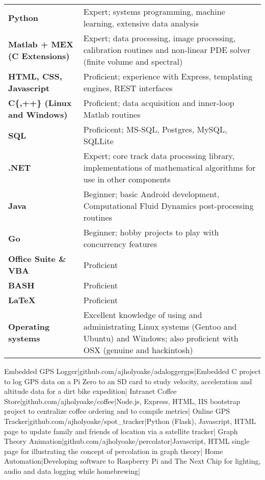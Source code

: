\documentclass[a4paper,10pt]{article}
\begin{document}
\begin{tabular}{p{2.8in}p{3.3in}}
\textbf{Python} & Expert; systems programming, machine learning, extensive data analysis \\
\textbf{Matlab + MEX (C Extensions)} & Expert; data processing, image processing, calibration routines and non-linear PDE solver (finite volume and spectral)\\
\textbf{HTML, CSS, Javascript} & Proficient; experience with Express, templating engines, REST interfaces\\
\textbf{C\{,++\} (Linux and Windows)}     & Proficient; data acquisition and inner-loop Matlab routines\\
\textbf{SQL} & Proficicent; MS-SQL, Postgres, MySQL, SQLLite \\
\textbf{.NET} & Expert; core track data processing library, implementations of mathematical algorithms for use in other components \\
\textbf{Java} & Beginner; basic Android development, Computational Fluid Dynamics post-processing routines\\
\textbf{Go} & Beginner; hobby projects to play with concurrency features\\
\textbf{Office Suite \& VBA} & Proficient\\
\textbf{BASH}   & Proficient\\
\textbf{\LaTeX} & Proficient\\
  \textbf{Operating systems} & Excellent knowledge of using and administrating Linux systems (Gentoo and Ubuntu) and Windows; also proficient with OSX (genuine and hackintosh)\\
\end{tabular}
\newline
\lineunder

\begin{2colsection}
\Rcc Embedded GPS Logger|github.com/ajholyoake/adaloggergps|Embedded C project
to log GPS data on a Pi Zero to an SD card to study velocity, acceleration and
altitude data for a dirt bike expedition|
\Rcc Intranet Coffee Store|github.com/ajholyoake/coffee|Node.js, Express, HTML, IIS
bootstrap project to centralize coffee ordering and to compile metrics|
\Rcc Online GPS Tracker|github.com/ajholyoake/spot\_tracker|Python (Flask),
Javascript, HTML page to update family and friends of location via a satellite tracker|
\Rcc Graph Theory Animation|github.com/ajholyoake/percolator|Javascript, HTML
single page for illustrating the concept of percolation in graph theory|
\Rc Home Automation|Developing software to Raspberry Pi and The Next Chip for
lighting, audio and data logging while homebrewing|
\end{2colsection}
\end{document}
